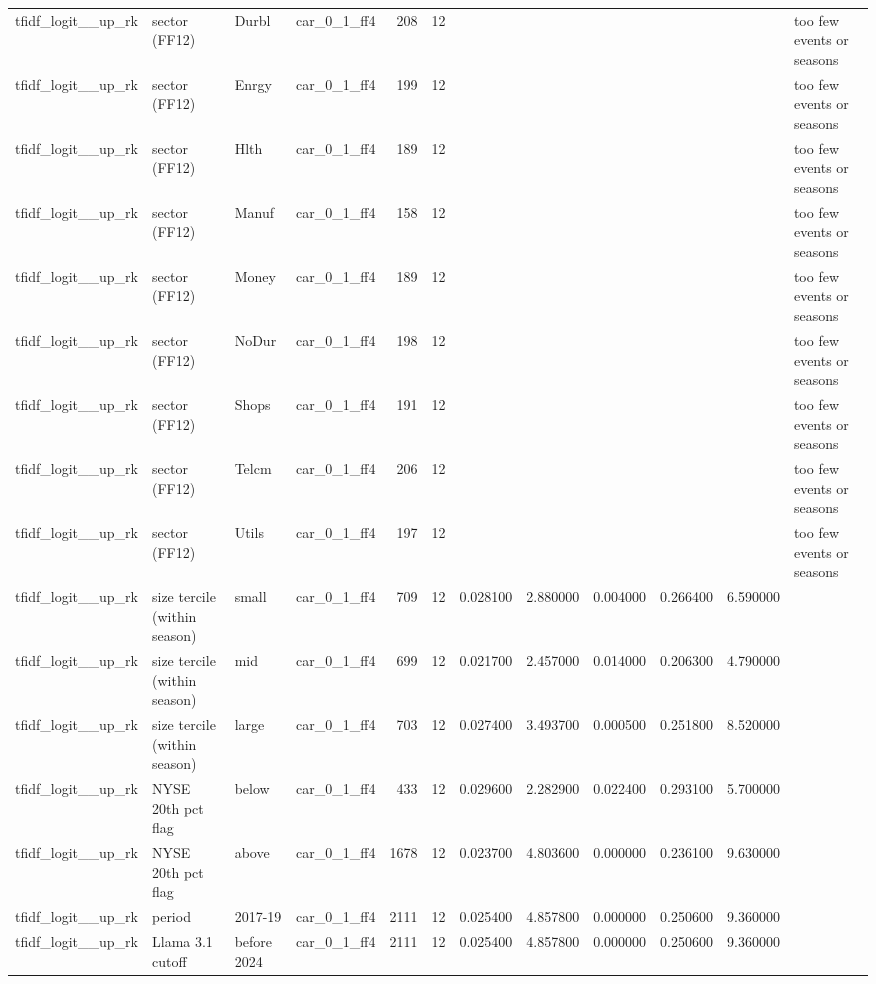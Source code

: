 \begin{table}
\begin{tabular}{llllrrrrrrrl}
tfidf\_logit\_\_up\_rk & sector (FF12) & Durbl & car\_0\_1\_ff4 & 208 & 12 &  &  &  &  &  & too few events or seasons \\
tfidf\_logit\_\_up\_rk & sector (FF12) & Enrgy & car\_0\_1\_ff4 & 199 & 12 &  &  &  &  &  & too few events or seasons \\
tfidf\_logit\_\_up\_rk & sector (FF12) & Hlth & car\_0\_1\_ff4 & 189 & 12 &  &  &  &  &  & too few events or seasons \\
tfidf\_logit\_\_up\_rk & sector (FF12) & Manuf & car\_0\_1\_ff4 & 158 & 12 &  &  &  &  &  & too few events or seasons \\
tfidf\_logit\_\_up\_rk & sector (FF12) & Money & car\_0\_1\_ff4 & 189 & 12 &  &  &  &  &  & too few events or seasons \\
tfidf\_logit\_\_up\_rk & sector (FF12) & NoDur & car\_0\_1\_ff4 & 198 & 12 &  &  &  &  &  & too few events or seasons \\
tfidf\_logit\_\_up\_rk & sector (FF12) & Shops & car\_0\_1\_ff4 & 191 & 12 &  &  &  &  &  & too few events or seasons \\
tfidf\_logit\_\_up\_rk & sector (FF12) & Telcm & car\_0\_1\_ff4 & 206 & 12 &  &  &  &  &  & too few events or seasons \\
tfidf\_logit\_\_up\_rk & sector (FF12) & Utils & car\_0\_1\_ff4 & 197 & 12 &  &  &  &  &  & too few events or seasons \\
tfidf\_logit\_\_up\_rk & size tercile (within season) & small & car\_0\_1\_ff4 & 709 & 12 & 0.028100 & 2.880000 & 0.004000 & 0.266400 & 6.590000 &  \\
tfidf\_logit\_\_up\_rk & size tercile (within season) & mid & car\_0\_1\_ff4 & 699 & 12 & 0.021700 & 2.457000 & 0.014000 & 0.206300 & 4.790000 &  \\
tfidf\_logit\_\_up\_rk & size tercile (within season) & large & car\_0\_1\_ff4 & 703 & 12 & 0.027400 & 3.493700 & 0.000500 & 0.251800 & 8.520000 &  \\
tfidf\_logit\_\_up\_rk & NYSE 20th pct flag & below & car\_0\_1\_ff4 & 433 & 12 & 0.029600 & 2.282900 & 0.022400 & 0.293100 & 5.700000 &  \\
tfidf\_logit\_\_up\_rk & NYSE 20th pct flag & above & car\_0\_1\_ff4 & 1678 & 12 & 0.023700 & 4.803600 & 0.000000 & 0.236100 & 9.630000 &  \\
tfidf\_logit\_\_up\_rk & period & 2017-19 & car\_0\_1\_ff4 & 2111 & 12 & 0.025400 & 4.857800 & 0.000000 & 0.250600 & 9.360000 &  \\
tfidf\_logit\_\_up\_rk & Llama 3.1 cutoff & before 2024 & car\_0\_1\_ff4 & 2111 & 12 & 0.025400 & 4.857800 & 0.000000 & 0.250600 & 9.360000 &  \\

\end{tabular}
\end{table}

